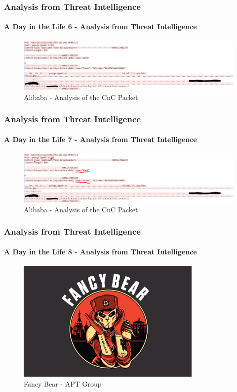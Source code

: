 \documentclass[aspectratio=169]{beamer}
\begin{document}
\begin{frame}
  \frametitle{Analysis from Threat Intelligence}
  \framesubtitle{A Day in the Life 6 - Analysis from Threat Intelligence}
  \begin{center}
    \begin{figure}
      \includegraphics[width=14cm,keepaspectratio]{alibaba_http}
      \caption{Alibaba - Analysis of the CnC Packet}
    \end{figure}
  \end{center}
\end{frame}

\begin{frame}
  \frametitle{Analysis from Threat Intelligence}
  \framesubtitle{A Day in the Life 7 - Analysis from Threat Intelligence}
  \begin{center}
    \begin{figure}
      \includegraphics[width=14cm,keepaspectratio]{alibaba_http_highlight}
      \caption{Alibaba - Analysis of the CnC Packet}
    \end{figure}
  \end{center}
\end{frame}

\begin{frame}
  \frametitle{Analysis from Threat Intelligence}
  \framesubtitle{A Day in the Life 8 - Analysis from Threat Intelligence}
  \begin{center}
    \begin{figure}
      \includegraphics[width=9cm,keepaspectratio]{fancybear_logo}
      \caption{Fancy Bear - APT Group}
    \end{figure}
  \end{center}
\end{frame}
\end{document}
